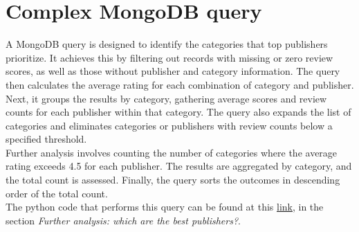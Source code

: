 
\section{Complex MongoDB query}

A MongoDB query is designed to identify the categories that top publishers prioritize.
It achieves this by filtering out records with missing or zero review scores,
as well as those without publisher and category information.
The query then calculates the average rating for each combination of category and publisher.
Next, it groups the results by category, gathering average scores and review counts for each publisher
within that category. The query also expands the list of categories and eliminates categories or
publishers with review counts below a specified threshold.\\
Further analysis involves counting the number of categories where the average rating exceeds 4.5 for each publisher.
The results are aggregated by category, and the total count is assessed. Finally, the query sorts the outcomes
in descending order of the total count.\\
The python code that performs this query can be found at this \href{https://github.com/DavideLigari01/data-science-project/blob/main/notebooks/hypotesis_testing/hypothesis_6.ipynb}{link},
in the section \textit{Further analysis: which are the best publishers?}.